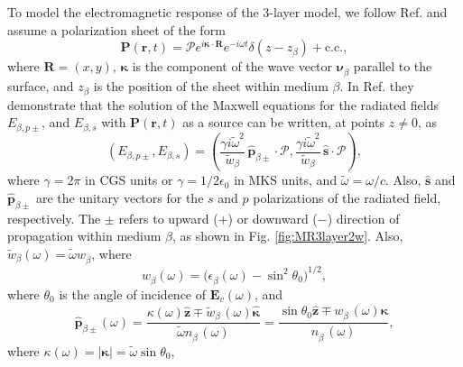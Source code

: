 To model the electromagnetic response of the 3-layer model, we follow Ref.
\cite{mizrahiJOSA88} and assume a polarization sheet of the form
\begin{equation}\label{eq:psheet}
\mathbf{P}(\mathbf{r},t) = \boldsymbol{\mathcal{P}}
e^{i\boldsymbol{\kappa}\cdot\mathbf{R}}e^{-i\omega t}\delta(z - z_{\beta}) 
+ \mathrm{c.c.},
\end{equation}
where $\mathbf{R}=(x,y)$, $\boldsymbol{\kappa}$ is the component of the wave
vector $\boldsymbol{\nu}^{\phantom{a}}_{\beta}$ parallel to the surface, and
$z_{\beta}$ is the position of the sheet within medium $\beta$. In Ref.
\cite{sipeJOSAB87} they demonstrate that the solution of the Maxwell equations
for the radiated fields $E_{\beta,p\pm}$, and $E_{\beta,s}$ with
$\mathbf{P}(\mathbf{r},t)$ as a source can be written, at points $z\neq 0$, as
\begin{equation}\label{eq:solmaxwell}
(E_{\beta,p\pm},E_{\beta,s}) = 
(\frac{\gamma i\tilde{\omega}^2}{\tilde{w}_{\beta}}
\,\hat{\mathbf{p}}_{\beta\pm}\cdot\boldsymbol{\mathcal{P}},
\frac{\gamma i\tilde{\omega}^2}{\tilde{w}_{\beta}}
\,\hat{\mathbf{s}}\cdot\boldsymbol{\mathcal{P}}),
\end{equation} 
where $\gamma=2\pi$ in CGS units or $\gamma=1/2\epsilon_{0}$ in MKS units, and
$\tilde{\omega}=\omega/c$. Also, $\hat{\mathbf{s}}$ and
$\hat{\mathbf{p}}_{\beta\pm}$ are the unitary vectors for the $s$ and $p$
polarizations of the radiated field, respectively. The $\pm$ refers to upward
($+$) or downward ($-$) direction of propagation within medium $\beta$, as shown
in Fig. \ref{fig:MR3layer2w}. Also,
$\tilde{w}^{\phantom{a}}_{\beta}(\omega)=\tilde{\omega}w^{\phantom{a}}_{\beta}$,
where
\begin{equation}\label{eq:wavevector}
w^{\phantom{a}}_{\beta}(\omega) = 
\big(\epsilon^{\phantom{a}}_{\beta}(\omega) - \sin^{2}\theta_{0}\big)^{1/2},
\end{equation}
where $\theta_{0}$ is the angle of incidence of $\mathbf{E}_{v}(\omega)$, and
\begin{equation}\label{eq:r4}
\hat{\mathbf{p}}^{\phantom{A}}_{\beta\pm}(\omega) =
  \frac{\kappa(\omega)\hat{\mathbf{z}}\mp 
  \tilde{w}^{\phantom{A}}_{\beta}(\omega)\hat{\boldsymbol{\kappa}}} 
  {\tilde{\omega} n^{\phantom{A}}_{\beta}(\omega)}
= \frac{\sin\theta_{0}\hat{\mathbf{z}}\mp 
  w^{\phantom{A}}_{\beta}(\omega)\hat{\boldsymbol{\kappa}}} 
  {n^{\phantom{A}}_{\beta}(\omega)},
\end{equation}
where $\kappa(\omega)=|\boldsymbol{\kappa}|=\tilde{\omega}\sin\theta_{0}$,
